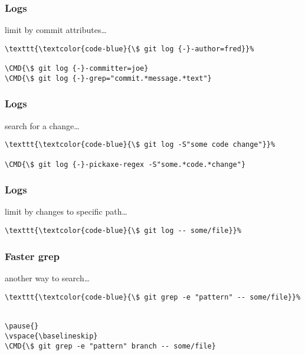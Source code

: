 \documentclass[english]{beamer}
\newcommand{\CMD}[1]{%
\texttt{\textcolor{code-blue}{#1}}%
}
\begin{document}
\begin{frame}[fragile]
\frametitle{Logs}

limit by commit attributes\ldots
\vspace{\baselineskip}

\begin{Verbatim}[commandchars=\\\{\}]
\CMD{\$ git log {-}-author=fred}
\CMD{\$ git log {-}-committer=joe}
\CMD{\$ git log {-}-grep="commit.*message.*text"}
\end{Verbatim}

\vspace{\textheight}
\end{frame}

\begin{frame}[fragile]
\frametitle{Logs}

search for a change\ldots
\vspace{\baselineskip}

\begin{Verbatim}[commandchars=\\\{\}]
\CMD{\$ git log -S"some code change"}
\CMD{\$ git log {-}-pickaxe-regex -S"some.*code.*change"}
\end{Verbatim}

\vspace{\textheight}
\end{frame}

\begin{frame}[fragile]
\frametitle{Logs}

limit by changes to specific path\ldots
\vspace{\baselineskip}

\begin{Verbatim}[commandchars=\\\{\}]
\CMD{\$ git log -- some/file}
\end{Verbatim}

\vspace{\textheight}
\end{frame}

\begin{frame}[fragile]
\frametitle{Faster grep}

another way to search\ldots
\vspace{\baselineskip}

\begin{Verbatim}[commandchars=\\\{\}]
\CMD{\$ git grep -e "pattern" -- some/file}

\pause{}
\vspace{\baselineskip}
\CMD{\$ git grep -e "pattern" branch -- some/file}
\end{Verbatim}

\vspace{\textheight}
\end{frame}
\end{document}
